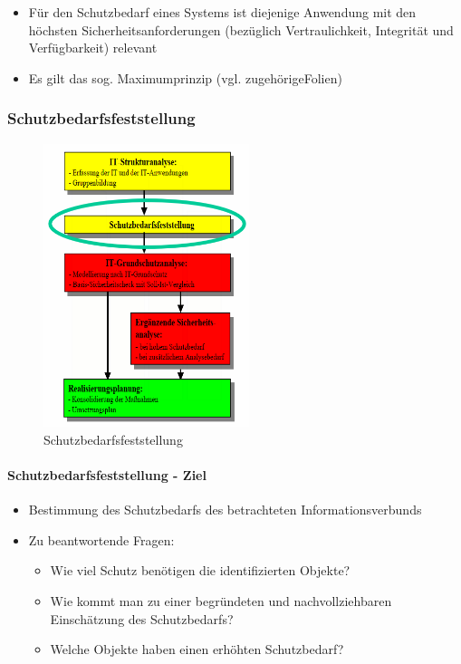 \documentclass[10pt,a4paper]{article}
\begin{document}
\begin{itemize}[noitemsep,topsep=0pt,leftmargin=*]
    \item Für den Schutzbedarf eines Systems ist diejenige Anwendung mit den höchsten Sicherheitsanforderungen (bezüglich Vertraulichkeit, Integrität und Verfügbarkeit) relevant
    \item Es gilt das sog. Maximumprinzip (vgl. zugehörigeFolien)
\end{itemize}

\subsubsection*{Schutzbedarfsfeststellung}
\begin{figure}[H]
    \begin{center}
    \includegraphics[width=6cm]{images/Schutzbedarfsfeststellung.png}
    \caption{Schutzbedarfsfeststellung}
    \label{Schutzbedarfsfeststellung}
    \end{center}
\end{figure}

\paragraph*{Schutzbedarfsfeststellung - Ziel}
\begin{itemize}[noitemsep,topsep=0pt,leftmargin=*]
    \item Bestimmung des Schutzbedarfs des
    betrachteten Informationsverbunds
    \item Zu beantwortende Fragen:
    \begin{itemize}[noitemsep,topsep=0pt,leftmargin=*]
        \item Wie viel Schutz benötigen die identifizierten Objekte?
        \item Wie kommt man zu einer begründeten und nachvollziehbaren Einschätzung des Schutzbedarfs?
        \item Welche Objekte haben einen erhöhten Schutzbedarf?
    \end{itemize}
\end{itemize}
\end{document}
